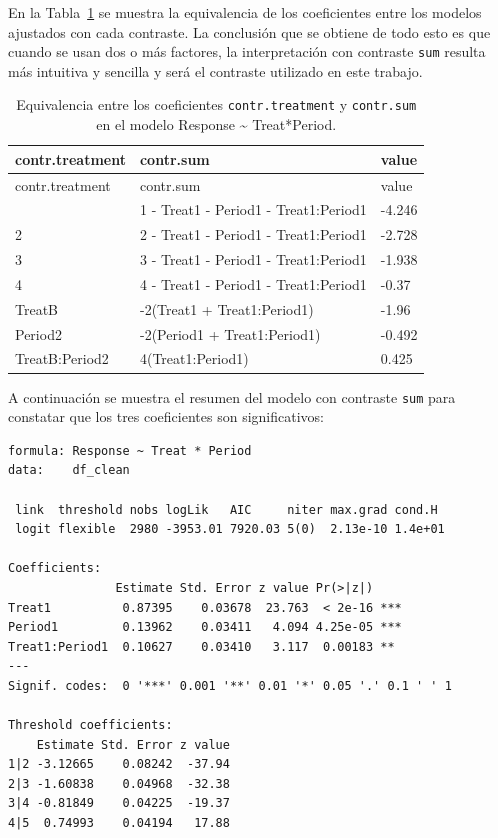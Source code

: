 \documentclass[
  12pt,
  a4paper,
  extrafontsizes,
  onecolumn,
  openright,
  table]{memoir}
\begin{document}
En la Tabla~\ref{tbl-contrat2} se muestra la equivalencia de los
coeficientes entre los modelos ajustados con cada contraste. La
conclusión que se obtiene de todo esto es que cuando se usan dos o más
factores, la interpretación con contraste \texttt{sum} resulta más
intuitiva y sencilla y será el contraste utilizado en este trabajo.

\small

\hypertarget{tbl-contrat2}{}
\begin{longtable}[]{@{}lll@{}}
\caption{\label{tbl-contrat2}Equivalencia entre los coeficientes
\texttt{contr.treatment} y \texttt{contr.sum} en el modelo Response
\textasciitilde{} Treat*Period.}\tabularnewline
\toprule\noalign{}
contr.treatment & contr.sum & value \\
\midrule\noalign{}
\endfirsthead
\toprule\noalign{}
contr.treatment & contr.sum & value \\
\midrule\noalign{}
\endhead
\bottomrule\noalign{}
\endlastfoot
1\textbar2 & 1\textbar2 - Treat1 - Period1 - Treat1:Period1 & -4.246 \\
2\textbar3 & 2\textbar3 - Treat1 - Period1 - Treat1:Period1 & -2.728 \\
3\textbar4 & 3\textbar4 - Treat1 - Period1 - Treat1:Period1 & -1.938 \\
4\textbar5 & 4\textbar5 - Treat1 - Period1 - Treat1:Period1 & -0.37 \\
TreatB & -2(Treat1 + Treat1:Period1) & -1.96 \\
Period2 & -2(Period1 + Treat1:Period1) & -0.492 \\
TreatB:Period2 & 4(Treat1:Period1) & 0.425 \\
\end{longtable}

\normalsize

A continuación se muestra el resumen del modelo con contraste
\texttt{sum} para constatar que los tres coeficientes son
significativos:

\begin{verbatim}
formula: Response ~ Treat * Period
data:    df_clean

 link  threshold nobs logLik   AIC     niter max.grad cond.H 
 logit flexible  2980 -3953.01 7920.03 5(0)  2.13e-10 1.4e+01

Coefficients:
               Estimate Std. Error z value Pr(>|z|)    
Treat1          0.87395    0.03678  23.763  < 2e-16 ***
Period1         0.13962    0.03411   4.094 4.25e-05 ***
Treat1:Period1  0.10627    0.03410   3.117  0.00183 ** 
---
Signif. codes:  0 '***' 0.001 '**' 0.01 '*' 0.05 '.' 0.1 ' ' 1

Threshold coefficients:
    Estimate Std. Error z value
1|2 -3.12665    0.08242  -37.94
2|3 -1.60838    0.04968  -32.38
3|4 -0.81849    0.04225  -19.37
4|5  0.74993    0.04194   17.88
\end{verbatim}
\end{document}
